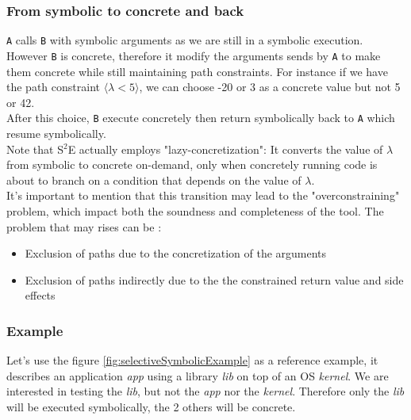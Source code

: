 \documentclass[11pt]{IEEEtran}
\begin{document}
    		\subsubsection*{From symbolic to concrete and back}
    			\texttt{A} calls \texttt{B} with symbolic arguments as we are still in a symbolic execution. However \texttt{B} is concrete, therefore it modify the arguments sends by \texttt{A} to make them concrete while still maintaining path constraints. For instance if we have the path constraint  $\langle \lambda < 5 \rangle$, we can choose -20 or 3 as a concrete value but not 5 or 42.\\
    			After this choice, \texttt{B} execute concretely then return symbolically back to \texttt{A} which resume symbolically.\\

    			Note that S$^2$E actually employs "lazy-concretization": It converts the value of $\lambda$ from symbolic to concrete on-demand, only when concretely running code is about to branch on a condition that depends on the value of $\lambda$. \\

    			It's important to mention that this transition may lead to the "overconstraining" problem, which impact both the soundness and completeness of the tool. The problem that may rises can be :
    			\begin{itemize}
    				\item Exclusion of paths due to the concretization of the arguments
    				\item Exclusion of paths indirectly due to the the constrained return value
and side effects
    			\end{itemize}

    	\subsubsection{Example}
    	\label{subsec:S2EExample}
    		Let's use the figure \ref{fig:selectiveSymbolicExample} as a reference example, it describes an application \emph{app} using a library \emph{lib} on top of an OS \emph{kernel}. We are interested in testing the \emph{lib}, but not the \emph{app} nor the \emph{kernel}. Therefore only the \emph{lib} will be executed symbolically, the 2 others will be concrete.\\
\end{document}

